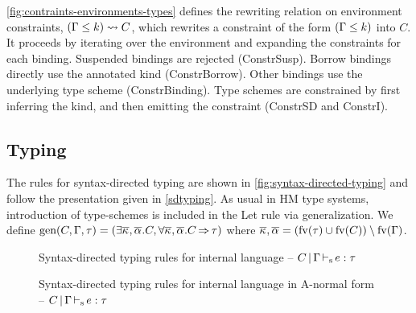 \cref{fig:contraints-environments-types} defines
the rewriting relation on environment constraints,
$(\Gamma \leq k) \leadsto C$, which rewrites a constraint of the form
$(\Gamma \leq k)$ into $C$. It proceeds by iterating over the environment
and expanding the constraints for each binding.
Suspended bindings are rejected ({\sc ConstrSusp}).
Borrow bindings directly use the annotated kind ({\sc ConstrBorrow}).
Other bindings use the underlying type scheme ({\sc ConstrBinding}).
Type schemes are constrained by first inferring the kind, and then
emitting the constraint ({\sc ConstrSD} and {\sc ConstrI}).


\subsection{Typing}

The rules for syntax-directed typing are shown in \cref{fig:syntax-directed-typing}
and follow the presentation given in \cref{sdtyping}.
As usual in HM type systems, introduction of type-schemes
is included in the {\sc Let} rule via generalization.
We define $\operatorname{\text{gen}}(C,\Gamma,\tau) =
(\exists \overline{\kappa_{{}}},\overline{\alpha_{{}}}.C,
\forall \overline{\kappa_{{}}},\overline{\alpha_{{}}}.C \operatorname{\Rightarrow} \tau)$
where
$\overline{\kappa_{{}}},\overline{\alpha_{{}}} = (\operatorname{fv}(\tau)\cup\operatorname{fv}(C))\setminus\operatorname{fv}(\Gamma)$.


\begin{figure*}[hbtp]
  
  \caption{Syntax-directed typing rules for internal language --
    $C \operatorname{|} \Gamma \operatorname{\vdash_s} e : \tau$}
  \label{fig:syntax-directed-typing-internal}
\end{figure*}

\begin{figure*}[hbtp]
  
  \caption{Syntax-directed typing rules for internal language in A-normal form --
    $C \operatorname{|} \Gamma \operatorname{\vdash_s} e : \tau$}
  \label{fig:syntax-directed-typing-internal-a}
\end{figure*}

